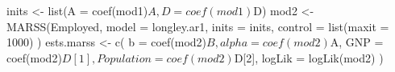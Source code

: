 \begin{Schunk}
\begin{Sinput}
 inits <- list(A = coef(mod1)$A, D = coef(mod1)$D)
 mod2 <- MARSS(Employed,
   model = longley.ar1, inits = inits,
   control = list(maxit = 1000)
 )
 ests.marss <- c(
   b = coef(mod2)$B, alpha = coef(mod2)$A,
   GNP = coef(mod2)$D[1], Population = coef(mod2)$D[2],
   logLik = logLik(mod2)
 )
\end{Sinput}
\end{Schunk}
